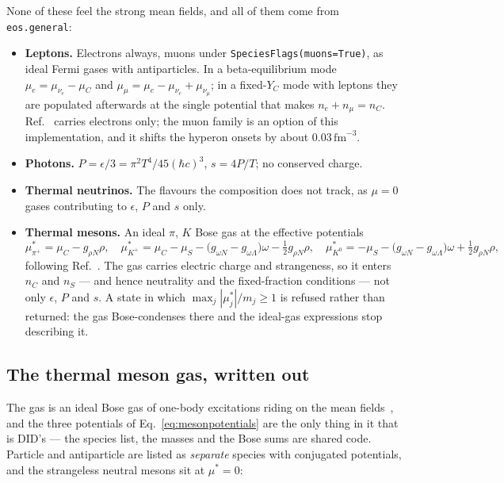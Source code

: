 \documentclass[aps,prc,onecolumn,superscriptaddress,nofootinbib,10pt]{revtex4-2}
\newcommand{\nC}{n_C}
\newcommand{\nS}{n_S}
\newcommand{\muC}{\mu_C}
\newcommand{\muS}{\mu_S}
\newcommand{\munue}{\mu_{\nu_e}}
\begin{document}
None of these feel the strong mean fields, and all of them come from
\texttt{eos.general}:
\begin{itemize}
\item \textbf{Leptons.} Electrons always, muons under
      \texttt{SpeciesFlags(muons=True)}, as ideal Fermi gases with
      antiparticles. In a beta-equilibrium mode $\mu_e = \munue - \muC$ and
      $\mu_\mu = \mu_e - \munue + \mu_{\nu_\mu}$; in a fixed-$Y_C$ mode with
      leptons they are populated afterwards at the single potential that
      makes $n_e + n_\mu = \nC$. Ref.~\cite{Frohaug2025} carries electrons
      only; the muon family is an option of this implementation, and it
      shifts the hyperon onsets by about $0.03\,\mathrm{fm}^{-3}$.
\item \textbf{Photons.} $P = \epsilon/3 = \pi^2 T^4/45(\hbar c)^3$,
      $s = 4P/T$; no conserved charge.
\item \textbf{Thermal neutrinos.} The flavours the composition does not track,
      as $\mu = 0$ gases contributing to $\epsilon$, $P$ and $s$ only.
\item \textbf{Thermal mesons.} An ideal $\pi$, $K$ Bose gas at the effective
      potentials
      \begin{equation}
        \mu^*_{\pi^+} = \muC - g_{\rho N}\rho , \quad
        \mu^*_{K^+} = \muC - \muS
          - \big(g_{\omega N} - g_{\omega \Lambda}\big)\omega
          - \tfrac{1}{2}g_{\rho N}\rho , \quad
        \mu^*_{K^0} = -\muS
          - \big(g_{\omega N} - g_{\omega \Lambda}\big)\omega
          + \tfrac{1}{2}g_{\rho N}\rho ,
        \label{eq:mesonpotentials}
      \end{equation}
      following Ref.~\cite{Lavagno2010}. The gas carries electric charge and
      strangeness, so it enters $\nC$ and $\nS$ --- and hence neutrality and
      the fixed-fraction conditions --- not only $\epsilon$, $P$ and $s$. A
      state in which $\max_j |\mu^*_j|/m_j \ge 1$ is refused rather than
      returned: the gas Bose-condenses there and the ideal-gas expressions
      stop describing it.
\end{itemize}

\subsection{The thermal meson gas, written out}
\label{sec:bosegas}

The gas is an ideal Bose gas of one-body excitations riding on the mean
fields~\cite{Lavagno2010}, and the three potentials of
Eq.~\eqref{eq:mesonpotentials} are the only thing in it that is DID's --- the
species list, the masses and the Bose sums are shared code. Particle and
antiparticle are listed as \emph{separate} species with conjugated potentials,
and the strangeless neutral mesons sit at $\mu^* = 0$:
\end{document}
